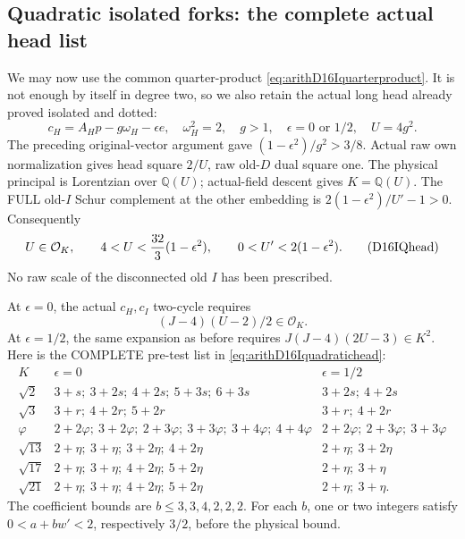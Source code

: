 \subsection{Quadratic isolated forks: the complete actual head list}
\label{app:arithD16Iquadratichead}

We may now use the common
quarter-product
\eqref{eq:arithD16Iquarterproduct}.
It is not enough by itself in
degree two, so we also retain
the actual long head already proved
isolated and dotted:
\[
 c_H=A_Hp-g\omega_H-\epsilon e,\quad
 \omega_H^2=2,\quad g>1,\quad
 \epsilon=0\text{ or }1/2,\quad U=4g^2 .
\]
The preceding original-vector
argument gave
\((1-\epsilon^2)/g^2>3/8\).
Actual raw own normalization gives
head square \(2/U\), raw old-\(D\)
dual square one.
The physical principal is Lorentzian
over \(\mathbb Q(U)\); actual-field
descent gives \(K=\mathbb Q(U)\).
The FULL old-\(I\) Schur complement
at the other embedding is
\(2(1-\epsilon^2)/U'-1>0\).
Consequently
\[
 U\in\mathcal O_K,\qquad
       4<U<{32\over3}(1-\epsilon^2),\qquad
       0<U'<2(1-\epsilon^2).
\tag{D16IQhead}\label{eq:arithD16Iquadratichead}
\]
No raw scale of the disconnected
old \(I\) has been prescribed.

At \(\epsilon=0\), the actual
\(c_H,c_I\) two-cycle requires
\[
                              (J-4)(U-2)/2\in\mathcal O_K .
\]
At \(\epsilon=1/2\), the same expansion
as before requires
\(J(J-4)(2U-3)\in K^2\).
Here is the COMPLETE pre-test list
in \eqref{eq:arithD16Iquadratichead}:
\[
\begin{array}{c|l|l}
 K&\epsilon=0&\epsilon=1/2\\ \hline
 \sqrt2&3+s;\ 3+2s;\ 4+2s;\ 5+3s;\ 6+3s&3+2s;\ 4+2s\\
 \sqrt3&3+r;\ 4+2r;\ 5+2r&3+r;\ 4+2r\\
 \varphi&2+2\varphi;\ 3+2\varphi;\ 2+3\varphi;\
       3+3\varphi;\ 3+4\varphi;\ 4+4\varphi&
       2+2\varphi;\ 2+3\varphi;\ 3+3\varphi\\
 \sqrt{13}&2+\eta;\ 3+\eta;\ 3+2\eta;\ 4+2\eta&2+\eta;\ 3+2\eta\\
 \sqrt{17}&2+\eta;\ 3+\eta;\ 4+2\eta;\ 5+2\eta&2+\eta;\ 3+\eta\\
 \sqrt{21}&2+\eta;\ 3+\eta;\ 4+2\eta;\ 5+2\eta&2+\eta;\ 3+\eta .
\end{array}
\]
The coefficient bounds are
\(b\le3,3,4,2,2,2\).
For each \(b\), one or two integers
satisfy \(0<a+bw'<2\), respectively
\(3/2\), before the physical bound.

